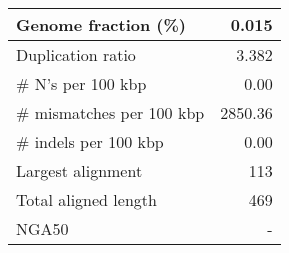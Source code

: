 \documentclass[12pt,a4paper]{article}
\begin{document}
\begin{table}[ht]
\begin{center}
\begin{tabular}{|l*{1}{|r}|}
Genome fraction (\%) & 0.015 \\ \hline
Duplication ratio & 3.382 \\ \hline
\# N's per 100 kbp & 0.00 \\ \hline
\# mismatches per 100 kbp & 2850.36 \\ \hline
\# indels per 100 kbp & 0.00 \\ \hline
Largest alignment & 113 \\ \hline
Total aligned length & 469 \\ \hline
NGA50 & - \\ \hline
\end{tabular}
\end{center}
\end{table}
\end{document}
